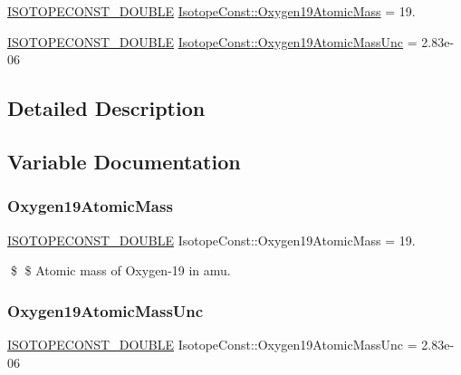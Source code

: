 \begin{DoxyCompactItemize}
\item 
\mbox{\hyperlink{group___isotope_const-_macros_ga8f45a7272ce02c0b4c65c44636ed719a}{I\+S\+O\+T\+O\+P\+E\+C\+O\+N\+S\+T\+\_\+\+D\+O\+U\+B\+LE}} \mbox{\hyperlink{group___isotope_const-_oxygen-_o19_ga4e40f17bce78602980678a35f4d0ebe6}{Isotope\+Const\+::\+Oxygen19\+Atomic\+Mass}} = 19.
\item 
\mbox{\hyperlink{group___isotope_const-_macros_ga8f45a7272ce02c0b4c65c44636ed719a}{I\+S\+O\+T\+O\+P\+E\+C\+O\+N\+S\+T\+\_\+\+D\+O\+U\+B\+LE}} \mbox{\hyperlink{group___isotope_const-_oxygen-_o19_ga1f291363fea175c7e670ad41c784ace9}{Isotope\+Const\+::\+Oxygen19\+Atomic\+Mass\+Unc}} = 2.\+83e-\/06
\end{DoxyCompactItemize}


\subsection{Detailed Description}


\subsection{Variable Documentation}
\mbox{\label{group___isotope_const-_oxygen-_o19_ga4e40f17bce78602980678a35f4d0ebe6}} 
\subsubsection{\texorpdfstring{Oxygen19\+Atomic\+Mass}{Oxygen19AtomicMass}}
{\footnotesize\ttfamily \mbox{\hyperlink{group___isotope_const-_macros_ga8f45a7272ce02c0b4c65c44636ed719a}{I\+S\+O\+T\+O\+P\+E\+C\+O\+N\+S\+T\+\_\+\+D\+O\+U\+B\+LE}} Isotope\+Const\+::\+Oxygen19\+Atomic\+Mass = 19.}

\$ \$ Atomic mass of Oxygen-\/19 in amu. \mbox{\label{group___isotope_const-_oxygen-_o19_ga1f291363fea175c7e670ad41c784ace9}} 
\subsubsection{\texorpdfstring{Oxygen19\+Atomic\+Mass\+Unc}{Oxygen19AtomicMassUnc}}
{\footnotesize\ttfamily \mbox{\hyperlink{group___isotope_const-_macros_ga8f45a7272ce02c0b4c65c44636ed719a}{I\+S\+O\+T\+O\+P\+E\+C\+O\+N\+S\+T\+\_\+\+D\+O\+U\+B\+LE}} Isotope\+Const\+::\+Oxygen19\+Atomic\+Mass\+Unc = 2.\+83e-\/06}

